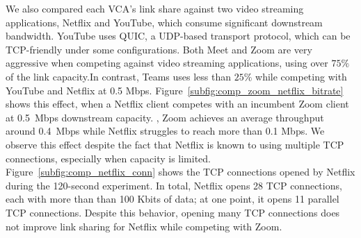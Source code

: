 We also compared each VCA's link share against two video streaming
applications, Netflix and YouTube,
which consume significant downstream bandwidth. 
YouTube uses QUIC, a UDP-based transport protocol,
which can be TCP-friendly under some configurations. 
Both Meet and Zoom are
very aggressive when competing against video streaming applications, using
over $75\%$ of the link capacity.In contrast, Teams uses
less than $25\%$ while competing with YouTube and Netflix at 0.5 Mbps.  
Figure~\ref{subfig:comp_zoom_netflix_bitrate} shows this effect, when a
Netflix client competes with an incumbent Zoom client at 0.5~Mbps downstream
capacity. , Zoom achieves an average throughput around 0.4~Mbps while
Netflix struggles to reach more than 0.1 Mbps. We observe this effect despite
the fact that Netflix is
known to using multiple TCP connections, especially when capacity is limited.
Figure~\ref{subfig:comp_netflix_conn} shows the TCP connections
opened by Netflix during the 120-second experiment. In total, Netflix opens 28
TCP connections, each with more than than 100 Kbits of data; at one point, it
opens 11 parallel TCP
connections. Despite this behavior, opening many TCP connections
does not improve link sharing for Netflix while competing with Zoom. 



